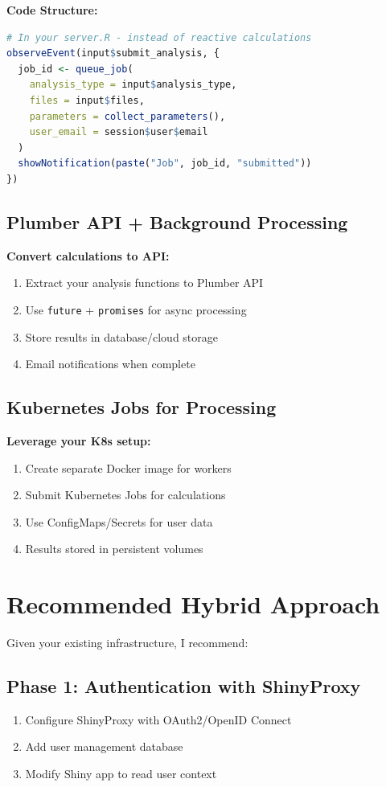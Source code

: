 \documentclass{article}
\begin{document}
\textbf{Code Structure:}
\begin{lstlisting}[language=R]
# In your server.R - instead of reactive calculations
observeEvent(input$submit_analysis, {
  job_id <- queue_job(
    analysis_type = input$analysis_type,
    files = input$files,
    parameters = collect_parameters(),
    user_email = session$user$email
  )
  showNotification(paste("Job", job_id, "submitted"))
})
\end{lstlisting}

\subsection{Plumber API + Background Processing}

\textbf{Convert calculations to API:}
\begin{enumerate}
\item Extract your analysis functions to Plumber API
\item Use \texttt{future} + \texttt{promises} for async processing
\item Store results in database/cloud storage
\item Email notifications when complete
\end{enumerate}

\subsection{Kubernetes Jobs for Processing}

\textbf{Leverage your K8s setup:}
\begin{enumerate}
\item Create separate Docker image for workers
\item Submit Kubernetes Jobs for calculations
\item Use ConfigMaps/Secrets for user data
\item Results stored in persistent volumes
\end{enumerate}

\section{Recommended Hybrid Approach}

Given your existing infrastructure, I recommend:

\subsection{Phase 1: Authentication with ShinyProxy}
\begin{enumerate}
\item Configure ShinyProxy with OAuth2/OpenID Connect
\item Add user management database
\item Modify Shiny app to read user context
\end{enumerate}
\end{document}

